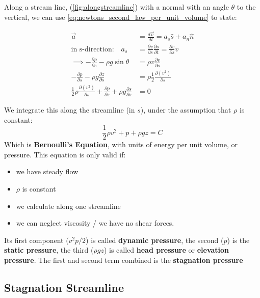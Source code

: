 Along a stream line, (\ref{fig:alongstreamline}) with a normal with an angle $\theta$ to the vertical, we can use \eqref{eq:newtons_second_law_per_unit_volume} to state:


\begin{equation*}
	\begin{split}
		\vec a &= \frac{d\vec v}{dt} = a_s \hat s + a_n \hat n\\
		\text{in s-direction:}\quad a_s &= \frac{\partial v}{\partial s} \frac{\partial s}{\partial t} = \frac{\partial v}{\partial s} v\\
		\implies -\frac{\partial p}{\partial s} - \rho g\sin\theta &= \rho v\frac{\partial v}{\partial s}\\
		-\frac{\partial p}{\partial s} - \rho g \frac{\partial z}{\partial s} &= \rho \frac 12 \frac{\partial (v^2)}{\partial s}\\
		\frac 12 \rho \frac{\partial (v^2)}{\partial s} + \frac{\partial p}{\partial s} + \rho g \frac{\partial s}{\partial s} &= 0
	\end{split}
\end{equation*}

We integrate this along the streamline (in $s$), under the assumption that $\rho$ is constant:
\begin{equation}
	\boxed{\frac 12 \rho v^2 + p + \rho g z = C}
	\label{eq:bernoullis_equation}
\end{equation}
Which is \textbf{Bernoulli's Equation}, with units of energy per unit volume, or pressure. This equation is only valid if:
\begin{itemize}
	\item we have steady flow
	\item $\rho$ is constant
	\item we calculate along one streamline
	\item we can neglect viscosity / we have no shear forces.
\end{itemize}

Its first component ($v^2p/2$) is called \textbf{dynamic pressure}, the second ($p$) is the \textbf{static pressure}, the third ($\rho gz$) is called \textbf{head pressure} or \textbf{elevation pressure}. The first and second term combined is the \textbf{stagnation pressure}

\subsection{Stagnation Streamline}

